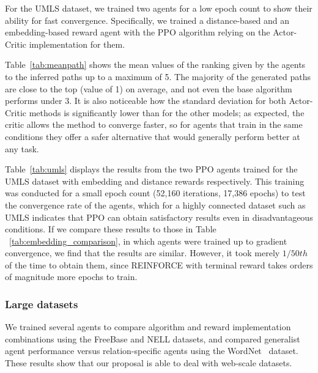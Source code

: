 For the UMLS dataset, we trained two agents for a low epoch count to show their ability for fast convergence. Specifically, we trained a distance-based and an embedding-based reward agent with the PPO algorithm relying on the Actor-Critic implementation for them. 



Table~\ref{tab:meanpath} shows the mean values of the ranking given by the agents to the inferred paths up to a maximum of 5. The majority of the generated paths are close to the top (value of 1) on average, and not even the base algorithm performs under 3. It is also noticeable how the standard deviation for both Actor-Critic methods is significantly lower than for the other models; as expected, the critic allows the method to converge faster, so for agents that train in the same conditions they offer a safer alternative that would generally perform better at any task.



Table~\ref{tab:umls} displays the results from the two PPO agents trained for the UMLS dataset with embedding and distance rewards respectively. This training was conducted for a small epoch count (52,160 iterations, 17,386 epochs) to test the convergence rate of the agents, which for a highly connected dataset such as UMLS indicates that PPO can obtain satisfactory results even in disadvantageous conditions. If we compare these results to those in Table ~\ref{tab:embedding_comparison}, in which agents were trained up to gradient convergence, we find that the results are similar. However, it took merely $1/50th$ of the time to obtain them, since REINFORCE with terminal reward takes orders of magnitude more epochs to train.

\subsubsection{Large datasets}
We trained several agents to compare algorithm and reward implementation combinations using the FreeBase
 and NELL
datasets, and compared generalist agent performance versus relation-specific agents using the WordNet~\cite{miller1995wordnet} dataset. These results show that our proposal is able to deal with web-scale datasets.

